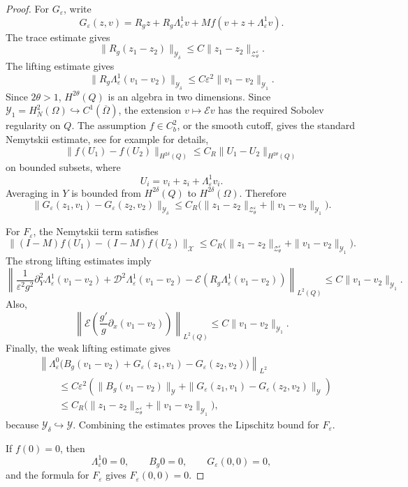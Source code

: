 \documentclass[11pt]{article}
\theoremstyle{definition}
\theoremstyle{remark}
\numberwithin{equation}{section}
\newcommand{\mc}[1]{\mathcal{#1}}
\begin{document}
\begin{proof}
For \(G_\varepsilon\), write
\[
G_\varepsilon(z,v)
=
R_gz+R_g\Lambda_\varepsilon^1v
+
Mf(v+z+\Lambda_\varepsilon^1v).
\]
The trace estimate gives
\[
\|R_g(z_1-z_2)\|_{\mathcal Y_\delta}
\le
C\|z_1-z_2\|_{\mc Z_\theta^\varepsilon}.
\]
The lifting estimate gives
\[
\|R_g\Lambda_\varepsilon^1(v_1-v_2)\|_{\mathcal Y_\delta}
\le
C\varepsilon^2\|v_1-v_2\|_{\mathcal Y_1}.
\]
Since \(2\theta>1\), \(H^{2\theta}(Q)\) is an algebra in two dimensions. Since
\(\mathcal Y_1=H^2_N(\Omega)\hookrightarrow C^1(\overline\Omega)\), the
extension \(v\mapsto\mathcal Ev\) has the required Sobolev regularity on \(Q\).
The assumption \(f\in C_b^2\), or the smooth cutoff, gives the standard
Nemytskii estimate, see for example \cite{runst2011sobolev} for details,
\[
\|f(U_1)-f(U_2)\|_{H^{2\delta}(Q)}
\le
C_R\|U_1-U_2\|_{H^{2\theta}(Q)}
\]
on bounded subsets, where
\[
U_i=v_i+z_i+\Lambda_\varepsilon^1v_i.
\]
Averaging in \(Y\) is bounded from \(H^{2\delta}(Q)\) to
\(H^{2\delta}(\Omega)\). Therefore
\[
\|G_\varepsilon(z_1,v_1)-G_\varepsilon(z_2,v_2)\|_{\mathcal Y_\delta}
\le
C_R
\bigl(
\|z_1-z_2\|_{\mc Z_\theta^\varepsilon}
+
\|v_1-v_2\|_{\mathcal Y_1}
\bigr).
\]

For \(F_\varepsilon\), the Nemytskii term satisfies
\[
\|(I-M)f(U_1)-(I-M)f(U_2)\|_{\mathcal X}
\le
C_R
\bigl(
\|z_1-z_2\|_{\mc Z_\theta^\varepsilon}
+
\|v_1-v_2\|_{\mathcal Y_1}
\bigr).
\]
The strong lifting estimates imply
\[
\left\|
\frac1{\varepsilon^2g^2}\partial_Y^2\Lambda_\varepsilon^1(v_1-v_2)
+
\mathcal D^2\Lambda_\varepsilon^1(v_1-v_2)
-
\mathcal E(R_g\Lambda_\varepsilon^1(v_1-v_2))
\right\|_{L^2(Q)}
\le
C\|v_1-v_2\|_{\mathcal Y_1}.
\]
Also,
\[
\left\|
\mathcal E\!\left(\frac{g'}g\partial_x(v_1-v_2)\right)
\right\|_{L^2(Q)}
\le
C\|v_1-v_2\|_{\mathcal Y_1}.
\]
Finally, the weak lifting estimate gives
\begin{align*}
&\left\|
\Lambda_\varepsilon^0
\bigl(
B_g(v_1-v_2)
+
G_\varepsilon(z_1,v_1)-G_\varepsilon(z_2,v_2)
\bigr)
\right\|_{L^2}
\\
&\qquad\le
C\varepsilon^2
\left(
\|B_g(v_1-v_2)\|_{\mathcal Y}
+
\|G_\varepsilon(z_1,v_1)-G_\varepsilon(z_2,v_2)\|_{\mathcal Y}
\right)
\\
&\qquad\le
C_R
\bigl(
\|z_1-z_2\|_{\mc Z_\theta^\varepsilon}
+
\|v_1-v_2\|_{\mathcal Y_1}
\bigr),
\end{align*}
because \(\mathcal Y_\delta\hookrightarrow\mathcal Y\). Combining the estimates
proves the Lipschitz bound for \(F_\varepsilon\).

If \(f(0)=0\), then
\[
\Lambda_\varepsilon^1 0=0,
\qquad
B_g0=0,
\qquad
G_\varepsilon(0,0)=0,
\]
and the formula for \(F_\varepsilon\) gives \(F_\varepsilon(0,0)=0\).
\end{proof}
\end{document}
